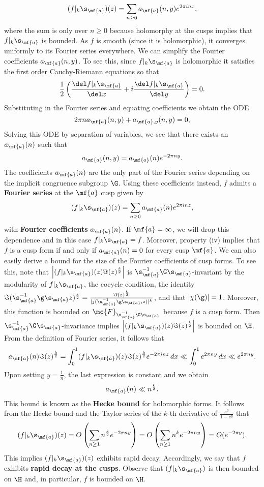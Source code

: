     \[
      (f|_{k}\s_{\mf{a}})(z) = \sum_{n \ge 0}a_{\mf{a}}(n,y)e^{2\pi inx},
    \]
    where the sum is only over $n \ge 0$ because holomorphy at the cusps implies that $f|_{k}\s_{\mf{a}}$ is bounded. As $f$ is smooth (since it is holomorphic), it converges uniformly to its Fourier series everywhere. We can simplify the Fourier coefficients $a_{\mf{a}}(n,y)$. To see this, since $f|_{k}\s_{\mf{a}}$ is holomorphic it satisfies the first order Cauchy-Riemann equations so that
    \[
      \frac{1}{2}\left(\frac{\del f|_{k}\s_{\mf{a}}}{\del x}+i\frac{\del f|_{k}\s_{\mf{a}}}{\del y}\right) = 0.
    \]
    Substituting in the Fourier series and equating coefficients we obtain the ODE
    \[
      2\pi na_{\mf{a}}(n,y)+a_{\mf{a},y}(n,y) = 0,
    \]
    Solving this ODE by separation of variables, we see that there exists an $a_{\mf{a}}(n)$ such that
    \[
      a_{\mf{a}}(n,y) = a_{\mf{a}}(n)e^{-2\pi ny}.
    \]
    The coefficients $a_{\mf{a}}(n)$ are the only part of the Fourier series depending on the implicit congruence subgroup $\G$. Using these coefficients instead, $f$ admits a \textbf{Fourier series} at the $\mf{a}$ cusp given by
    \[
      (f|_{k}\s_{\mf{a}})(z) = \sum_{n \ge 0}a_{\mf{a}}(n)e^{2\pi inz},
    \]
    with \textbf{Fourier coefficients} $a_{\mf{a}}(n)$. If $\mf{a} = \infty$, we will drop this dependence and in this case $f|_{k}\s_{\mf{a}} = f$. Moreover, property (iv) implies that $f$ is a cusp form if and only if $a_{\mf{a}}(n) = 0$ for every cusp $\mf{a}$. We can also easily derive a bound for the size of the Fourier coefficients of cusp forms. To see this, note that $\left|(f|_{k}\s_{\mf{a}})(z)\Im(z)^{\frac{k}{2}}\right|$ is $\s_{\mf{a}}^{-1}\G\s_{\mf{a}}$-invariant by the modularity of $f|_{k}\s_{\mf{a}}$, the cocycle condition, the identity $\Im(\s_{\mf{a}}^{-1}\g\s_{\mf{a}}z)^{\frac{k}{2}} = \frac{\Im(z)^{\frac{k}{2}}}{|j(\s_{\mf{a}}^{-1}\g\s_{\mf{a}},z)|^{k}}$, and that $|\chi(\g)| = 1$. Moreover, this function is bounded on $\mc{F}_{\s_{\mf{a}}^{-1}\G\s_{\mf{a}}}$ because $f$ is a cusp form. Then $\s_{\mf{a}}^{-1}\G\s_{\mf{a}}$-invariance implies $\left|(f|_{k}\s_{\mf{a}})(z)\Im(z)^{\frac{k}{2}}\right|$ is bounded on $\H$. From the definition of Fourier series, it follows that
    \[
      a_{\mf{a}}(n)\Im(z)^{\frac{k}{2}} = \int_{0}^{1}(f|_{k}\s_{\mf{a}})(z)\Im(z)^{\frac{k}{2}}e^{-2\pi inz}\,dx \ll \int_{0}^{1}e^{2\pi ny}\,dx \ll e^{2\pi ny}.
    \]
    Upon setting $y = \frac{1}{n}$, the last expression is constant and we obtain
    \[
      a_{\mf{a}}(n) \ll n^{\frac{k}{2}}.
    \]
    This bound is known as the \textbf{Hecke bound} for holomorphic forms. It follows from the Hecke bound and the Taylor series of the $k$-th derivative of $\frac{e^{y}}{1-e^{y}}$ that
    \[
      (f|_{k}\s_{\mf{a}})(z) = O\left(\sum_{n \ge 1}n^{\frac{k}{2}}e^{-2\pi ny}\right) = O\left(\sum_{n \ge 1}n^{k}e^{-2\pi ny}\right) = O(e^{-2\pi y}).
    \]
    This implies $(f|_{k}\s_{\mf{a}})(z)$ exhibits rapid decay. Accordingly, we say that $f$ exhibits \textbf{rapid decay at the cusps}. Observe that $(f|_{k}\s_{\mf{a}})$ is then bounded on $\H$ and, in particular, $f$ is bounded on $\H$.
